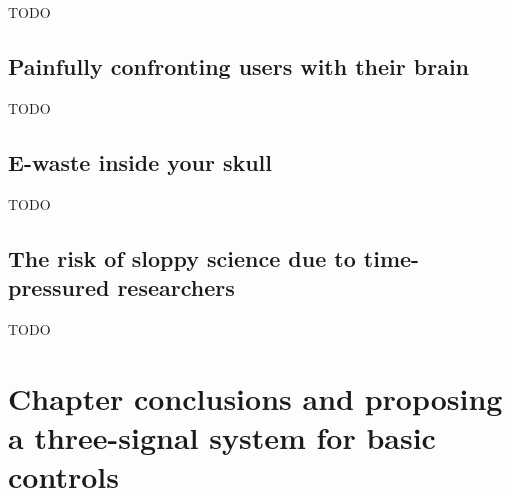 TODO


\subsection{Painfully confronting users with their brain}
\label{subsec:bci_ethical_confronting}

TODO


\subsection{E-waste inside your skull}
\label{subsec:bci_ethical_e_waste}



TODO


\subsection{The risk of sloppy science due to time-pressured researchers}
\label{subsec:bci_ethical_sloppy_science}


TODO


\section{Chapter conclusions and proposing a three-signal system for basic controls}
\label{sec:bci_concolusion_and_proposing_ours}

